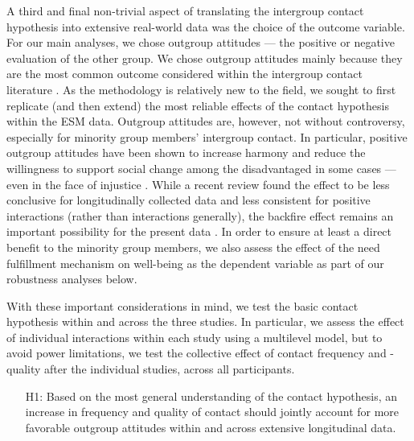 \documentclass[man, 12pt, a4paper, mask]{apa7}
\theoremstyle{break}
\theoremstyle{plain}
\begin{document}
A third and final non-trivial aspect of translating the intergroup contact hypothesis into extensive real-world data was the choice of the outcome variable. For our main analyses, we chose outgroup attitudes --- the positive or negative evaluation of the other group. We chose outgroup attitudes mainly because they are the most common outcome considered within the intergroup contact literature \citep[e.g.,][]{Pettigrew2006, Paolini2021}. As the methodology is relatively new to the field, we sought to first replicate (and then extend) the most reliable effects of the contact hypothesis within the ESM data. Outgroup attitudes are, however, not without controversy, especially for minority group members' intergroup contact. In particular, positive outgroup attitudes have been shown to increase harmony and reduce the willingness to support social change among the disadvantaged in some cases --- even in the face of injustice \citep[e.g.,][]{dixon2012, saguy2009}. While a recent review found the effect to be less conclusive for longitudinally collected data and less consistent for positive interactions (rather than interactions generally), the backfire effect remains an important possibility for the present data \citep[see][]{reimer2023}. In order to ensure at least a direct benefit to the minority group members, we also assess the effect of the need fulfillment mechanism on well-being as the dependent variable as part of our robustness analyses below.

With these important considerations in mind, we test the basic contact hypothesis within and across the three studies. In particular, we assess the effect of individual interactions within each study using a multilevel model, but to avoid power limitations, we test the collective effect of contact frequency and -quality after the individual studies, across all participants.
\begin{enumerate}[leftmargin=1.5\parindent]
    \item[H1:] Based on the most general understanding of the contact hypothesis, an increase in frequency and quality of contact should jointly account for more favorable outgroup attitudes within and across extensive longitudinal data.
\end{enumerate}
\end{document}
